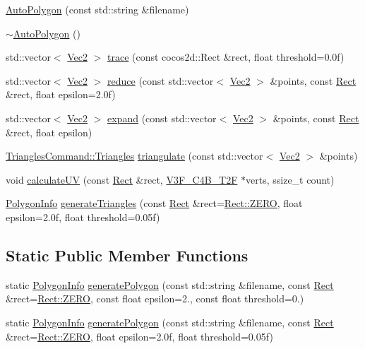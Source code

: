 \begin{DoxyCompactItemize}
\item 
\hyperlink{classAutoPolygon_gaa74351ac8f735344958e7b2ac8363bb5}{Auto\+Polygon} (const std\+::string \&filename)
\item 
\hyperlink{classAutoPolygon_gaca856dfbfddcb64d3fa29bf261dd10f8}{$\sim$\+Auto\+Polygon} ()
\item 
std\+::vector$<$ \hyperlink{classVec2}{Vec2} $>$ \hyperlink{group____2d_gaac8f745760eabe0b1bfeff151b84f1f3}{trace} (const cocos2d\+::\+Rect \&rect, float threshold=0.\+0f)
\item 
std\+::vector$<$ \hyperlink{classVec2}{Vec2} $>$ \hyperlink{group____2d_ga0dc5100249481cd749cb692f6986cec0}{reduce} (const std\+::vector$<$ \hyperlink{classVec2}{Vec2} $>$ \&points, const \hyperlink{classRect}{Rect} \&rect, float epsilon=2.\+0f)
\item 
std\+::vector$<$ \hyperlink{classVec2}{Vec2} $>$ \hyperlink{group____2d_gab3d27e5dc8a0078f98b43db486b4a89f}{expand} (const std\+::vector$<$ \hyperlink{classVec2}{Vec2} $>$ \&points, const \hyperlink{classRect}{Rect} \&rect, float epsilon)
\item 
\hyperlink{structTrianglesCommand_1_1Triangles}{Triangles\+Command\+::\+Triangles} \hyperlink{classAutoPolygon_ga0ee3e7e22fdf9982ec084191928caffa}{triangulate} (const std\+::vector$<$ \hyperlink{classVec2}{Vec2} $>$ \&points)
\item 
void \hyperlink{group____2d_gaa52f7459e5e90aaa2192a813dba5c699}{calculate\+UV} (const \hyperlink{classRect}{Rect} \&rect, \hyperlink{structV3F__C4B__T2F}{V3\+F\+\_\+\+C4\+B\+\_\+\+T2F} $\ast$verts, ssize\+\_\+t count)
\item 
\hyperlink{classPolygonInfo}{Polygon\+Info} \hyperlink{group____2d_gaf6a1f4dad82ff92fe6b5d26bea05f42a}{generate\+Triangles} (const \hyperlink{classRect}{Rect} \&rect=\hyperlink{classRect_a590be46e60027b2ca0f62a457f91a83e}{Rect\+::\+Z\+E\+RO}, float epsilon=2.\+0f, float threshold=0.\+05f)
\end{DoxyCompactItemize}
\subsection*{Static Public Member Functions}
\begin{DoxyCompactItemize}
\item 
static \hyperlink{classPolygonInfo}{Polygon\+Info} \hyperlink{group____2d_ga666950d66e9c86bab409f01b0daeb831}{generate\+Polygon} (const std\+::string \&filename, const \hyperlink{classRect}{Rect} \&rect=\hyperlink{classRect_a590be46e60027b2ca0f62a457f91a83e}{Rect\+::\+Z\+E\+RO}, const float epsilon=2., const float threshold=0.)
\item 
static \hyperlink{classPolygonInfo}{Polygon\+Info} \hyperlink{classAutoPolygon_ga666950d66e9c86bab409f01b0daeb831}{generate\+Polygon} (const std\+::string \&filename, const \hyperlink{classRect}{Rect} \&rect=\hyperlink{classRect_a590be46e60027b2ca0f62a457f91a83e}{Rect\+::\+Z\+E\+RO}, float epsilon=2.\+0f, float threshold=0.\+05f)
\end{DoxyCompactItemize}
